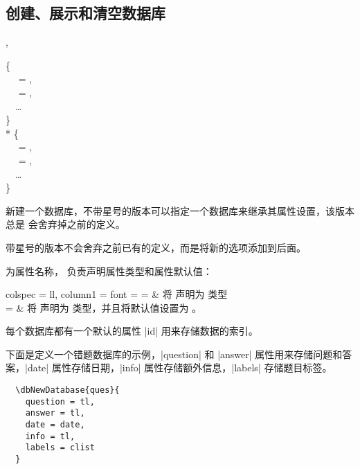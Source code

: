 \documentclass[full]{l3doc}
\def\orbar{\textup{\textbar}}
\begin{document}
\begin{documentation}
\subsection{创建、展示和清空数据库}
\begin{function}[added=2022-01-05]{\dbNewDatabase, \dbNewDatabase*}
  \begin{syntax}
       \{ \\
    ~~ = , \\
    ~~ = , \\
    ~~\ldots{} \\
    \} \\
    *  \{ \\
    ~~ = , \\
    ~~ = , \\
    ~~\ldots{} \\
    \} \\
  \end{syntax}

\end{function}

  新建一个数据库，不带星号的版本可以指定一个数据库来继承其属性设置，该版本总是
  会舍弃掉之前的定义。

  带星号的版本不会舍弃之前已有的定义，而是将新的选项添加到后面。

   为属性名称， 负责声明属性类型和属性默认值：

  \noindent\begin{tblr}{
    colspec = {ll},
    column{1} = {font = \ttfamily}
  }
     =  &
    将  声明为  类型 \\
     = \orbar{} &
    将  声明为  类型，并且将默认值设置为 。
    \\
  \end{tblr}

  \begin{note}
    每个数据库都有一个默认的属性 |id| 用来存储数据的索引。
  \end{note}

  下面是定义一个错题数据库的示例，|question| 和 |answer| 属性用来存储问题和答
  案，|date| 属性存储日期，|info| 属性存储额外信息，|labels| 存储题目标签。
\begin{verbatim}
  \dbNewDatabase{ques}{
    question = tl,
    answer = tl,
    date = date,
    info = tl,
    labels = clist
  }
\end{verbatim}


\end{documentation}
\end{document}
